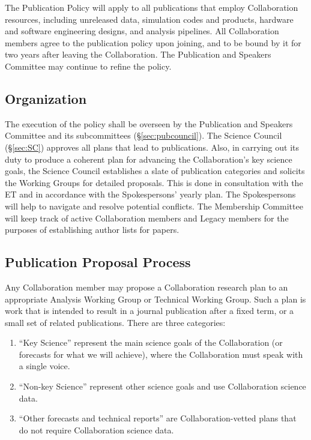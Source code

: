 \documentclass[12pt]{article}
\begin{document}
The Publication Policy will apply to all publications that employ Collaboration resources, including unreleased data, simulation codes and products, hardware and software engineering designs, and analysis pipelines. All Collaboration members agree to the publication policy upon joining, and to be bound by it for two years after leaving the Collaboration. The Publication and Speakers Committee may continue to refine the policy.
\subsection{Organization}

The execution of the policy shall be overseen by the Publication and Speakers Committee and its subcommittees (\S\ref{sec:pubcouncil}). The Science Council (\S\ref{sec:SC}) approves all plans that lead to publications. Also, in carrying out its duty to produce a coherent plan for advancing the Collaboration's key science goals, the Science Council establishes a slate of publication categories and solicits the Working Groups for detailed proposals. This is done in consultation with the ET and in accordance with the Spokespersons' yearly plan. The Spokespersons will help to navigate and resolve potential conflicts. The Membership Committee will keep track of active Collaboration members and Legacy members for the purposes of establishing author lists for papers.

\subsection{Publication Proposal Process}
\label{sec:pubprop}

Any Collaboration member may propose a Collaboration research plan to an appropriate Analysis Working Group or Technical Working Group.  Such a plan is work that is intended to result in a journal publication after a fixed term, or a small set of related publications.  There are three categories:
\begin{enumerate}

\item ``Key Science'' represent the main science goals of the Collaboration (or forecasts for what we will achieve), where the Collaboration must speak with a single voice.

\item ``Non-key Science'' represent other science goals and use Collaboration science data.

\item ``Other forecasts and technical reports'' are Collaboration-vetted plans that do not require Collaboration science data.

\end{enumerate}
\end{document}
